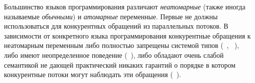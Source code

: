 
Большинство языков программирования различают 
\emph{неатомарные} (также иногда называемые \emph{обычными})
и \emph{атомарные} переменные.
Первые не должны использоваться для конкурентных 
обращений из параллельных потоков. 
В зависимости от конкретного языка программирования
конкурентные обращения к неатомарным переменным 
либо полностью запрещены системой типов
(\eg \Haskell~\cite{Marlow-al:Haskell10, Vollmer-al:PPoPP17}, \Rust~\cite{RustBook:19}), 
либо имеют неопределенное поведение (\eg \CPP~\cite{Boehm-Adve:PLDI08, Batty-al:POPL11}), 
либо обладают очень слабой семантикой
не дающей практический никаких гарантий о порядке
в котором конкурентные потоки могут наблюдать эти обращения
(\eg \Java~\cite{Manson-al:POPL05}). 

